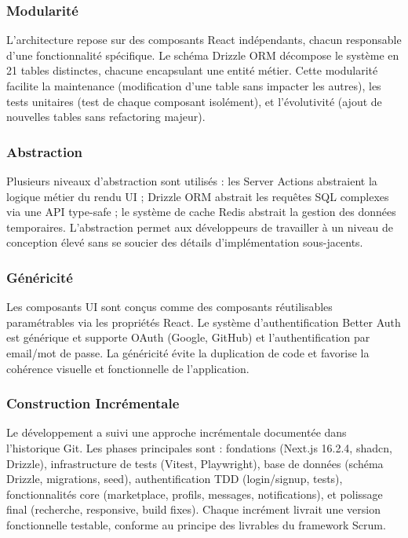 \subsubsection{Modularité}

L'architecture repose sur des composants React indépendants, chacun responsable d'une fonctionnalité spécifique. Le schéma Drizzle ORM décompose le système en 21 tables distinctes, chacune encapsulant une entité métier. Cette modularité facilite la maintenance (modification d'une table sans impacter les autres), les tests unitaires (test de chaque composant isolément), et l'évolutivité (ajout de nouvelles tables sans refactoring majeur).

\subsubsection{Abstraction}

Plusieurs niveaux d'abstraction sont utilisés : les Server Actions abstraient la logique métier du rendu UI ; Drizzle ORM abstrait les requêtes SQL complexes via une API type-safe ; le système de cache Redis abstrait la gestion des données temporaires. L'abstraction permet aux développeurs de travailler à un niveau de conception élevé sans se soucier des détails d'implémentation sous-jacents.

\subsubsection{Généricité}

Les composants UI sont conçus comme des composants réutilisables paramétrables via les propriétés React. Le système d'authentification Better Auth est générique et supporte OAuth (Google, GitHub) et l'authentification par email/mot de passe. La généricité évite la duplication de code et favorise la cohérence visuelle et fonctionnelle de l'application.

\subsubsection{Construction Incrémentale}

Le développement a suivi une approche incrémentale documentée dans l'historique Git. Les phases principales sont : fondations (Next.js 16.2.4, shadcn, Drizzle), infrastructure de tests (Vitest, Playwright), base de données (schéma Drizzle, migrations, seed), authentification TDD (login/signup, tests), fonctionnalités core (marketplace, profils, messages, notifications), et polissage final (recherche, responsive, build fixes). Chaque incrément livrait une version fonctionnelle testable, conforme au principe des livrables du framework Scrum.

